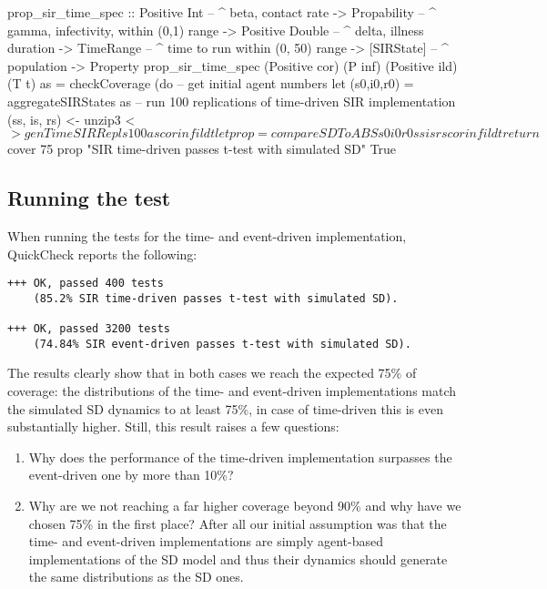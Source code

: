 \begin{HaskellCode}
prop_sir_time_spec :: Positive Int    -- ^ beta, contact rate
                   -> Propability     -- ^ gamma, infectivity, within (0,1) range
                   -> Positive Double -- ^ delta, illness duration
                   -> TimeRange       -- ^ time to run within (0, 50) range
                   -> [SIRState]      -- ^ population
                   -> Property
prop_sir_time_spec 
    (Positive cor) (P inf) (Positive ild) (T t) as = checkCoverage (do
  -- get initial agent numbers
  let (s0,i0,r0) = aggregateSIRStates as
  -- run 100 replications of time-driven SIR implementation
  (ss, is, rs) <- unzip3 <$> genTimeSIRRepls 100 as cor inf ild t
  let prop = compareSDToABS s0 i0 r0 ss is rs cor inf ild t
  return $ cover 75 prop "SIR time-driven passes t-test with simulated SD" True
\end{HaskellCode}

\subsection{Running the test}
When running the tests for the time- and event-driven implementation, QuickCheck reports the following:

\begin{verbatim}
+++ OK, passed 400 tests 
    (85.2% SIR time-driven passes t-test with simulated SD).

+++ OK, passed 3200 tests 
    (74.84% SIR event-driven passes t-test with simulated SD).
\end{verbatim}

The results clearly show that in both cases we reach the expected 75\% of coverage: the distributions of the time- and event-driven implementations match the simulated SD dynamics to at least 75\%, in case of time-driven this is even substantially higher. Still, this result raises a few questions:

\begin{enumerate}
	\item Why does the performance of the time-driven implementation surpasses the event-driven one by more than 10\%?
	
	\item Why are we not reaching a far higher coverage beyond 90\% and why have we chosen 75\% in the first place? After all our initial assumption was that the time- and event-driven implementations are simply agent-based implementations of the SD model and thus their dynamics should generate the same distributions as the SD ones.	
\end{enumerate}

